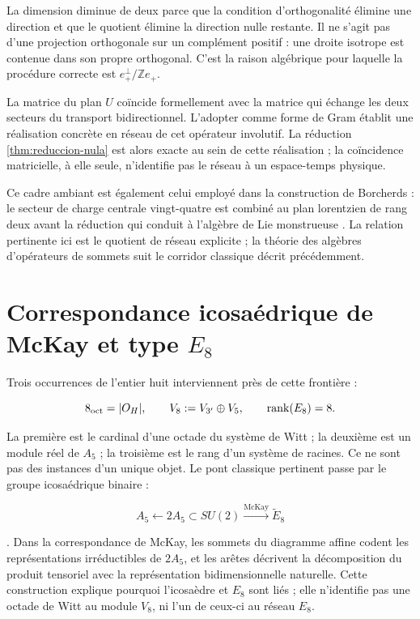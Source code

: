 La dimension diminue de deux parce que la condition d'orthogonalité élimine
une direction et que le quotient élimine la direction nulle restante. Il ne s'agit pas
d'une projection orthogonale sur un complément positif : une droite
isotrope est contenue dans son propre orthogonal. C'est la raison algébrique
pour laquelle la procédure correcte est \(e_+^\perp/\mathbb Ze_+\).

La matrice du plan \(U\) coïncide formellement avec la matrice qui échange
les deux secteurs du transport bidirectionnel. L'adopter comme forme de Gram
établit une réalisation concrète en réseau de cet opérateur involutif. La réduction
\cref{thm:reduccion-nula} est alors exacte au sein de cette réalisation ;
la coïncidence matricielle, à elle seule, n'identifie pas le réseau à un
espace-temps physique.

Ce cadre ambiant est également celui employé dans la construction de Borcherds : le
secteur de charge centrale vingt-quatre est combiné au plan lorentzien de
rang deux avant la réduction qui conduit à l'algèbre de Lie monstrueuse
\cite{Borcherds1992}. La relation pertinente ici est le quotient de réseau
explicite ; la théorie des algèbres d'opérateurs de sommets suit le corridor
classique décrit précédemment.


\section{Correspondance icosaédrique de McKay et type \texorpdfstring{\(E_8\)}{E8}}
\label{sec:tres-ochos}

Trois occurrences de l'entier huit interviennent près de cette frontière :

\[
8_{\rm oct}=|O_H|,
\qquad
V_8:=V_{3'}\oplus V_5,
\qquad
\operatorname{rank}(E_8)=8.
\]

La première est le cardinal d'une octade du système de Witt ; la deuxième est
un module réel de \(A_5\) ; la troisième est le rang d'un système de racines. Ce ne
sont pas des instances d'un unique objet. Le pont classique pertinent passe par le
groupe icosaédrique binaire :

\[
A_5\longleftarrow2A_5\subset SU(2)
\xrightarrow{\text{McKay}}\widetilde E_8
\]

\cite{McKay1980}. Dans la correspondance de McKay, les sommets du diagramme
affine codent les représentations irréductibles de \(2A_5\), et les arêtes
décrivent la décomposition du produit tensoriel avec la représentation
bidimensionnelle naturelle. Cette construction explique pourquoi l'icosaèdre et
\(E_8\) sont liés ; elle n'identifie pas une octade de Witt au module
\(V_8\), ni l'un de ceux-ci au réseau \(E_8\).

